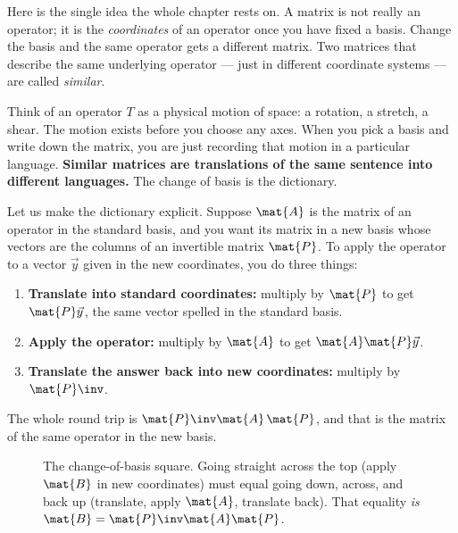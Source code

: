Here is the single idea the whole chapter rests on. A matrix is not really an operator;
it is the \emph{coordinates} of an operator once you have fixed a basis. Change the
basis and the same operator gets a different matrix. Two matrices that describe the
same underlying operator --- just in different coordinate systems --- are called
\emph{similar}.

\begin{intuitionbox}
Think of an operator $T$ as a physical motion of space: a rotation, a stretch, a shear.
The motion exists before you choose any axes. When you pick a basis and write down the
matrix, you are just recording that motion in a particular language. \textbf{Similar
matrices are translations of the same sentence into different languages.} The change of
basis is the dictionary.
\end{intuitionbox}

Let us make the dictionary explicit. Suppose $\mat{A}$ is the matrix of an operator in
the standard basis, and you want its matrix in a new basis whose vectors are the columns
of an invertible matrix $\mat{P}$. To apply the operator to a vector $\vec{y}$ given in
the new coordinates, you do three things:

\begin{enumerate}
\item \textbf{Translate into standard coordinates:} multiply by $\mat{P}$ to get
  $\mat{P}\vec{y}$, the same vector spelled in the standard basis.
\item \textbf{Apply the operator:} multiply by $\mat{A}$ to get $\mat{A}\mat{P}\vec{y}$.
\item \textbf{Translate the answer back into new coordinates:} multiply by $\mat{P}\inv$.
\end{enumerate}

The whole round trip is $\mat{P}\inv \mat{A}\, \mat{P}$, and that is the matrix of the
same operator in the new basis.

\begin{figure}[H]
\centering
{}
\caption{The change-of-basis square. Going straight across the top (apply $\mat{B}$ in
new coordinates) must equal going down, across, and back up (translate, apply $\mat{A}$,
translate back). That equality \emph{is} $\mat{B}=\mat{P}\inv\mat{A}\mat{P}$.}
\label{ch28:cob-square}
\end{figure}

